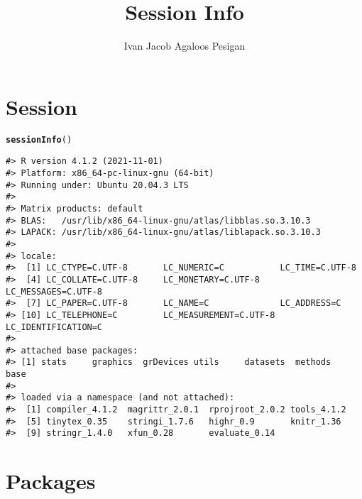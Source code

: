 \documentclass{article}\usepackage[]{graphicx}\usepackage[]{color}
\title{Session Info}
\author{Ivan Jacob Agaloos Pesigan}
\date{}
\makeatletter
\newcommand{\hlstd}[1]{\textcolor[rgb]{0.345,0.345,0.345}{#1}}%
\newcommand{\hlkwd}[1]{\textcolor[rgb]{0.737,0.353,0.396}{\textbf{#1}}}%
\newenvironment{kframe}{%
 \def\at@end@of@kframe{}%
 \ifinner\ifhmode%
  \def\at@end@of@kframe{\end{minipage}}%
  \begin{minipage}{\columnwidth}%
 \fi\fi%
 \def\FrameCommand##1{\hskip\@totalleftmargin \hskip-\fboxsep
 \colorbox{shadecolor}{##1}\hskip-\fboxsep
     \hskip-\linewidth \hskip-\@totalleftmargin \hskip\columnwidth}%
 \MakeFramed {\advance\hsize-\width
   \@totalleftmargin\z@ \linewidth\hsize
   \@setminipage}}%
 {\par\unskip\endMakeFramed%
 \at@end@of@kframe}
\newenvironment{knitrout}{}{} %
\makeatother
\begin{document}
\maketitle





\section*{Session}

\begin{knitrout}
\color{fgcolor}\begin{kframe}
\begin{alltt}
\hlkwd{sessionInfo}\hlstd{()}
\end{alltt}
\begin{verbatim}
#> R version 4.1.2 (2021-11-01)
#> Platform: x86_64-pc-linux-gnu (64-bit)
#> Running under: Ubuntu 20.04.3 LTS
#> 
#> Matrix products: default
#> BLAS:   /usr/lib/x86_64-linux-gnu/atlas/libblas.so.3.10.3
#> LAPACK: /usr/lib/x86_64-linux-gnu/atlas/liblapack.so.3.10.3
#> 
#> locale:
#>  [1] LC_CTYPE=C.UTF-8       LC_NUMERIC=C           LC_TIME=C.UTF-8       
#>  [4] LC_COLLATE=C.UTF-8     LC_MONETARY=C.UTF-8    LC_MESSAGES=C.UTF-8   
#>  [7] LC_PAPER=C.UTF-8       LC_NAME=C              LC_ADDRESS=C          
#> [10] LC_TELEPHONE=C         LC_MEASUREMENT=C.UTF-8 LC_IDENTIFICATION=C   
#> 
#> attached base packages:
#> [1] stats     graphics  grDevices utils     datasets  methods   base     
#> 
#> loaded via a namespace (and not attached):
#>  [1] compiler_4.1.2  magrittr_2.0.1  rprojroot_2.0.2 tools_4.1.2    
#>  [5] tinytex_0.35    stringi_1.7.6   highr_0.9       knitr_1.36     
#>  [9] stringr_1.4.0   xfun_0.28       evaluate_0.14
\end{verbatim}
\end{kframe}
\end{knitrout}

\section*{Packages}
\end{document}
